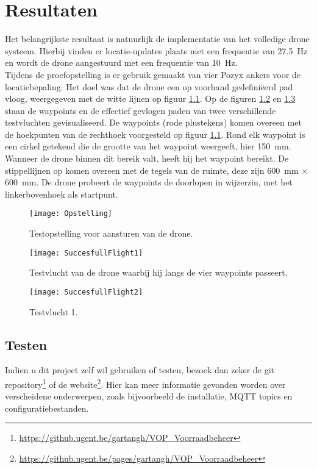 \chapter{Resultaten}
Het belangrijkste resultaat is natuurlijk de implementatie van het volledige drone systeem. Hierbij vinden er locatie-updates plaats met een frequentie van \SI{27.5}{\Hz} en wordt de drone aangestuurd met een frequentie van \SI{10}{\Hz}.\\

Tijdens de proefopstelling is er gebruik gemaakt van vier Pozyx ankers voor de locatiebepaling.
Het doel was dat de drone een op voorhand gedefiniëerd pad vloog, weergegeven met de witte lijnen op figuur \ref{fig:Opstelling}.
Op de figuren \ref{fig:SuccesfullFlight1} en \ref{fig:SuccesfullFlight2} staan de waypoints en de effectief gevlogen paden van twee verschillende testvluchten gevisualiseerd.
De waypoints (rode plustekens) komen overeen met de hoekpunten van de rechthoek voorgesteld op figuur \ref{fig:Opstelling}.
Rond elk waypoint is een cirkel getekend die de grootte van het waypoint weergeeft, hier \SI{150}{\mm}.
Wanneer de drone binnen dit bereik valt, heeft hij het waypoint bereikt.
De stippellijnen op komen overeen met de tegels van de ruimte, deze zijn \SI{600}{\mm} $\times$ \SI{600}{\mm}.
De drone probeert de waypoints de doorlopen in wijzerzin, met het linkerbovenhoek als startpunt. 
\begin{figure}[p]
	\centering
	\texttt{[image: Opstelling]}
	\caption[Opstelling testvluchten]{Testopstelling voor aansturen van de drone.}
	\label{fig:Opstelling}
\end{figure}

\begin{figure}[p]	
	\centering
	\texttt{[image: SuccesfullFlight1]}
	\caption[Testvlucht 1]{Testvlucht van de drone waarbij hij langs de vier waypoints passeert.}
	\label{fig:SuccesfullFlight1}
\end{figure}
	
\begin{figure}[p]
	\centering
	\texttt{[image: SuccesfullFlight2]}
	\caption[Testvlucht 2]{Testvlucht 1.}
	\label{fig:SuccesfullFlight2}
\end{figure}

\section{Testen} \label{sec:test}
Indien u dit project zelf wil gebruiken of testen, bezoek dan zeker de git repository\footnote{\url{https://github.ugent.be/gartangh/VOP_Voorraadbeheer}} of de website\footnote{\url{https://github.ugent.be/pages/gartangh/VOP_Voorraadbeheer}}.
Hier kan meer informatie gevonden worden over verscheidene onderwerpen, zoals bijvoorbeeld de installatie, MQTT topics en configuratiebestanden.


